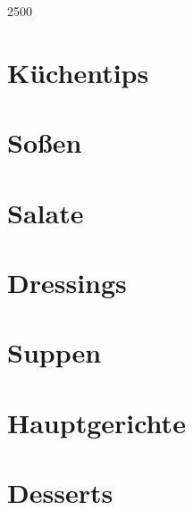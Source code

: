\documentclass[10pt, a4paper, twoside]{book} %
\makeatletter
\newcommand\GRAANDE{\@setfontsize\Huge{250}{0}}
\makeatother
\begin{document}
\renewcommand{\indexname}{S\-t\-i\-c\-h\-w\-o\-r\-t\-v\-e\-r\-z\-e\-i\-c\-h\-n\-i\-s}

\justify
\setlength\parindent{0pt}

\thispagestyle{empty}
\vspace*{3cm}
\begin{center}
{\GRAANDE{\textsc{}}}
\vspace{2cm}
\end{center}
\vspace{3cm}
\newpage

\tableofcontents

\cleardoublepage
\printindex

\cleardoublepage
{}

\chapter{K\-ü\-c\-h\-e\-n\-t\-i\-p\-s}
\thispagestyle{empty}

\chapter{S\-o\-ß\-e\-n}
\thispagestyle{empty}




\chapter{S\-a\-l\-a\-t\-e}
\thispagestyle{empty}

\chapter{D\-r\-e\-s\-s\-i\-n\-g\-s}
\thispagestyle{empty}




\chapter{S\-u\-p\-p\-e\-n}
\thispagestyle{empty}

\chapter{H\-a\-u\-p\-t\-g\-e\-r\-i\-c\-h\-t\-e}
\thispagestyle{empty}

\chapter{D\-e\-s\-s\-e\-r\-t\-s}
\thispagestyle{empty}



\end{document}
